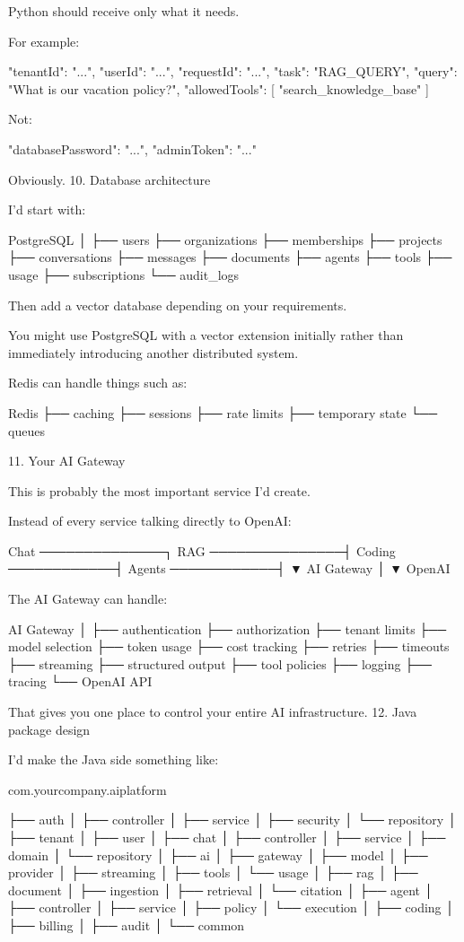 Python should receive only what it needs.

For example:

{
  "tenantId": "...",
  "userId": "...",
  "requestId": "...",
  "task": "RAG_QUERY",
  "query": "What is our vacation policy?",
  "allowedTools": [
    "search_knowledge_base"
  ]
}

Not:

{
  "databasePassword": "...",
  "adminToken": "..."
}

Obviously.
10. Database architecture

I'd start with:

PostgreSQL
     │
     ├── users
     ├── organizations
     ├── memberships
     ├── projects
     ├── conversations
     ├── messages
     ├── documents
     ├── agents
     ├── tools
     ├── usage
     ├── subscriptions
     └── audit_logs

Then add a vector database depending on your requirements.

You might use PostgreSQL with a vector extension initially rather than immediately introducing another distributed system.

Redis can handle things such as:

Redis
 ├── caching
 ├── sessions
 ├── rate limits
 ├── temporary state
 └── queues

11. Your AI Gateway

This is probably the most important service I'd create.

Instead of every service talking directly to OpenAI:

Chat ──────────────┐
RAG ───────────────┤
Coding ────────────┤
Agents ────────────┤
                  ▼
             AI Gateway
                  │
                  ▼
                OpenAI

The AI Gateway can handle:

AI Gateway
│
├── authentication
├── authorization
├── tenant limits
├── model selection
├── token usage
├── cost tracking
├── retries
├── timeouts
├── streaming
├── structured output
├── tool policies
├── logging
├── tracing
└── OpenAI API

That gives you one place to control your entire AI infrastructure.
12. Java package design

I'd make the Java side something like:

com.yourcompany.aiplatform

├── auth
│   ├── controller
│   ├── service
│   ├── security
│   └── repository
│
├── tenant
│
├── user
│
├── chat
│   ├── controller
│   ├── service
│   ├── domain
│   └── repository
│
├── ai
│   ├── gateway
│   ├── model
│   ├── provider
│   ├── streaming
│   ├── tools
│   └── usage
│
├── rag
│   ├── document
│   ├── ingestion
│   ├── retrieval
│   └── citation
│
├── agent
│   ├── controller
│   ├── service
│   ├── policy
│   └── execution
│
├── coding
│
├── billing
│
├── audit
│
└── common

